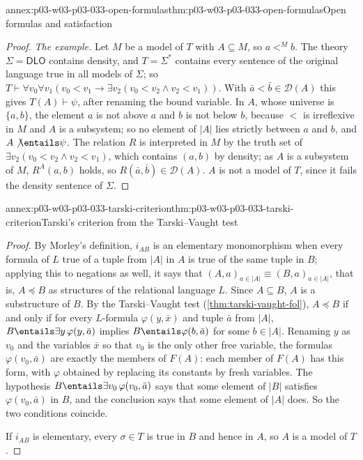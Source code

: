 \begin{annexitem}{annex:p03-w03-p03-033-open-formulas}{thm:p03-w03-p03-033-open-formulas}{Open formulas and satisfaction}
\begin{proof}
\emph{The example.} Let \(M\) be a model of \(T\) with \(A\subseteq M\),
so \(a<^Mb\). The theory \(\Sigma=\mathsf{DLO}\) contains density, and
\(T=\Sigma^*\) contains every sentence of the original language true in
all models of \(\Sigma\); so \(T\vdash\forall v_0\forall v_1(v_0<v_1\to
\exists v_2(v_0<v_2\wedge v_2<v_1))\). With \(\bar a<\bar b\in\mathscr
D(A)\) this gives \(T(A)\vdash\psi\), after renaming the bound variable.
In \(A\), whose universe is \(\{a,b\}\), the element \(a\) is not above
\(a\) and \(b\) is not below \(b\), because \(<\) is irreflexive in
\(M\) and \(A\) is a subsystem; so no element of \(|A|\) lies strictly
between \(a\) and \(b\), and \(A\not\entails\psi\). The relation \(R\) is
interpreted in \(M\) by the truth set of
\(\exists v_2(v_0<v_2\wedge v_2<v_1)\), which contains \((a,b)\) by
density; as \(A\) is a subsystem of \(M\), \(R^A(a,b)\) holds, so
\(R(\bar a,\bar b)\in\mathscr D(A)\). \(A\) is not a model of \(T\), since
it fails the density sentence of \(\Sigma\).
\end{proof}
\end{annexitem}

\begin{annexitem}{annex:p03-w03-p03-033-tarski-criterion}{thm:p03-w03-p03-033-tarski-criterion}{Tarski's criterion from the Tarski--Vaught test}
\begin{proof}
By Morley's definition, \(i_{AB}\) is an elementary monomorphism when every
formula of \(L\) true of a tuple from \(|A|\) in \(A\) is true of the
same tuple in \(B\); applying this to negations as well, it says that
\((A,a)_{a\in|A|}\equiv(B,a)_{a\in|A|}\), that is, \(A\preccurlyeq B\) as
structures of the relational language \(L\). Since \(A\subseteq B\), \(A\)
is a substructure of \(B\). By the Tarski--Vaught test
(\cref{thm:tarski-vaught-fol}), \(A\preccurlyeq B\) if and only if for
every \(L\)-formula \(\varphi(y,\bar x)\) and tuple \(\bar a\) from
\(|A|\), \(B\entails\exists y\,\varphi(y,\bar a)\) implies
\(B\entails\varphi(b,\bar a)\) for some \(b\in|A|\). Renaming \(y\) as
\(v_0\) and the variables \(\bar x\) so that \(v_0\) is the only other free
variable, the formulas \(\varphi(v_0,\bar a)\) are exactly the members of
\(F(A)\): each member of \(F(A)\) has this form, with \(\varphi\) obtained
by replacing its constants by fresh variables. The hypothesis
\(B\entails\exists v_0\,\varphi(v_0,\bar a)\) says that some element of
\(|B|\) satisfies \(\varphi(v_0,\bar a)\) in \(B\), and the conclusion
says that some element of \(|A|\) does. So the two conditions coincide.

If \(i_{AB}\) is elementary, every \(\sigma\in T\) is true in \(B\) and
hence in \(A\), so \(A\) is a model of \(T\).
\end{proof}
\end{annexitem}

